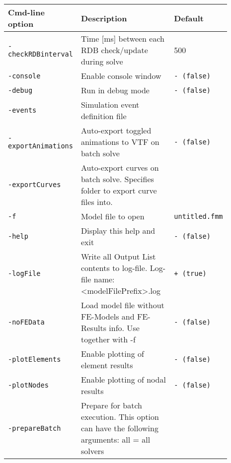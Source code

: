 
\noindent
\begin{threeparttable}[b]
\footnotesize
\begin{tabular}{|>{\raggedright} p{0.23\linewidth}| p{0.48\linewidth}| p{0.18\linewidth}|}
  \hline
  \rowcolor[HTML]{EFEFEF}
  \rule{0pt}{15pt}Cmd-line option & Description & Default \\
  \hline\hline
  {\tt-checkRDBinterval} & Time [ms] between each RDB check/update during solve & 500 \\
  \hline
  \texttt{-console} &  Enable console window  &   \texttt{- (false)} \\
  \hline
  \texttt{-debug} & Run in debug mode  &   \texttt{- (false)} \\
  \hline
  \texttt{-events}  &   Simulation event definition file  & \\
  \hline
  \texttt{-exportAnimations}  &   Auto-export toggled animations to VTF on batch solve & \texttt{- (false)} \\
  \hline
  \texttt{-exportCurves}  &   Auto-export curves on batch solve.\newline
                              Specifies folder to export curve files into. & \\
  \hline
  \texttt{-f\tnote{1}}  &   Model file to open & \texttt{untitled.fmm} \\
  \hline
  \texttt{-help}  &   Display this help and exit & \texttt{- (false)} \\
  \hline
  \texttt{-logFile}  &   Write all Output List contents to log-file.\newline
                         Log-file name: <modelFilePrefix>.log         & \texttt{+ (true)} \\
  \hline
  \texttt{-noFEData}  &   Load model file without FE-Models and FE-Results info. Use together with -f & \texttt{- (false)} \\
  \hline
  \texttt{-plotElements}  &   Enable plotting of element results & \texttt{- (false)} \\
  \hline
  \texttt{-plotNodes}  &   Enable plotting of nodal results & \texttt{- (false)} \\
  \hline
  \texttt{-prepareBatch}  &   Prepare for batch execution. This option can have the following arguments:\newline
                              all = all solvers\newline

\end{tabular}
\end{threeparttable}
